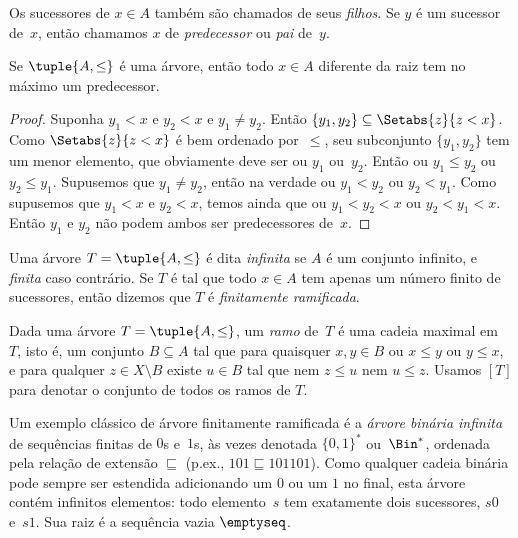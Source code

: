 \documentclass[../../../include/open-logic-section]{subfiles}
\begin{document}
Os sucessores de $x \in A$ também são chamados de seus \emph{filhos}. Se
$y$ é um sucessor de~$x$, então chamamos $x$ de \emph{predecessor} ou
\emph{pai} de~$y$.

\begin{prop}
Se $\tuple{A,\le}$ é uma árvore, então todo $x \in A$ diferente da raiz
tem no máximo um predecessor.
\end{prop}

\begin{proof}
  Suponha $y_1 < x$ e $y_2 < x$ e $y_1 \neq y_2$. Então $\{y_1,
  y_2\} \subseteq \Setabs{z}{z<x}$. Como $\Setabs{z}{z<x}$ é
  bem ordenado por~$\le$, seu subconjunto $\{y_1, y_2\}$ tem um menor
  elemento, que obviamente deve ser ou $y_1$ ou~$y_2$. Então ou
  $y_1 \le y_2$ ou $y_2 \le y_1$. Supusemos que $y_1 \neq y_2$, então
  na verdade ou $y_1 < y_2$ ou $y_2 < y_1$. Como supusemos que
  $y_1 < x$ e $y_2 < x$, temos ainda que ou $y_1 < y_2
  < x$ ou $y_2 < y_1 < x$. Então $y_1$ e $y_2$ não podem ambos ser
  predecessores de~$x$.
\end{proof}

\begin{defn}
Uma árvore $T = \tuple{A, \le}$ é dita \emph{infinita} se $A$ é um
conjunto infinito, e \emph{finita} caso contrário. Se $T$ é tal que todo
$x \in A$ tem apenas um número finito de sucessores, então dizemos que $T$ é
\emph{finitamente ramificada}.
\end{defn}

\begin{defn}[Ramos]
Dada uma árvore $T = \tuple{A, \le}$, um \emph{ramo} de~$T$ é uma
cadeia maximal em~$T$, isto é, um conjunto $B \subseteq A$ tal que
para quaisquer $x, y \in B$ ou $x \le y$ ou $y \le x$, e para qualquer
$z \in X \setminus B$ existe $u \in B$ tal que nem
$z \le u$ nem $u \le z$.
%
Usamos $[T]$ para denotar o conjunto de todos os ramos de $T$.
\end{defn}

\begin{ex}
Um exemplo clássico de árvore finitamente ramificada é a
\emph{árvore binária infinita} de sequências finitas de $0$s e~$1$s,
às vezes denotada $\{0,1\}^*$ ou~$\Bin^*$, ordenada pela relação de
extensão $\sqsubseteq$ (p.ex., $101 \sqsubseteq 101101$).
Como qualquer cadeia binária pode sempre ser estendida adicionando
um $0$ ou um $1$ no final, esta árvore contém infinitos
elementos: todo elemento~$s$ tem exatamente dois sucessores, $s0$ e~$s1$. Sua raiz é a sequência vazia $\emptyseq$.
\end{ex}
\end{document}

